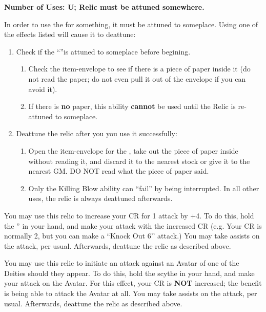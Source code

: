 \documentclass[green]{GL2020}
\begin{document}
\name{\gDeathRelic{}}

\textbf{Number of Uses: U; Relic must be attuned somewhere.}

In order to use the \iScythe{} for something, it must be attuned to someplace. Using one of the effects listed will cause it to deattune:
\begin{enumerate}
  \item Check if the ``\iScythe{}''is attuned to someplace before begining.
  \begin{enumerate}
    \item Check the item-envelope to see if there is a piece of paper inside it (do not read the paper; do not even pull it out of the envelope if you can avoid it).
    \item If there is \textbf{no} paper, this ability \textbf{cannot} be used until the Relic is re-attuned to someplace.
  \end{enumerate}
  \item Deattune the relic after you you use it successfully:
  \begin{enumerate}
    \item Open the item-envelope for the \iScythe{}, take out the piece of paper inside without reading it, and discard it to the nearest stock or give it to the nearest GM. DO NOT read what the piece of paper said.
    \item Only the Killing Blow ability can ``fail'' by being interrupted. In all other uses, the relic is always deattuned afterwards.
    \end{enumerate}
\end{enumerate}

You may use this relic to increase your CR for 1 attack by +4. To do this, hold the \iScythe{}'' in your hand, and make your attack with the increased CR (e.g. Your CR is normally 2, but you can make a ``Knock Out 6’’ attack.) You may take assists on the attack, per usual. Afterwards, deattune the relic as described above.

You may use this relic to initiate an attack against an Avatar of one of the Deities should they appear. To do this, hold the scythe in your hand, and make your attack on the Avatar. For this effect, your CR is \textbf{NOT} increased; the benefit is being able to attack the Avatar at all. You may take assists on the attack, per usual. Afterwards, deattune the relic as described above.
\end{document}
